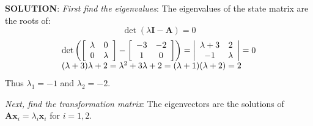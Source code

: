\textbf{SOLUTION}: \emph{First find the eigenvalues}:
The eigenvalues of the state matrix are the roots of:
\[
\det(\lambda\mathbf{I}-\mathbf{A})=0
\]
\[
\begin{array}{l}
 \det \left( {\left[ {\begin{array}{*{20}c}
   \lambda  & 0  \\
   0 & \lambda   \\
\end{array}} \right] - \left[ {\begin{array}{*{20}c}
   { - 3} & { - 2}  \\
   1 & 0  \\
\end{array}} \right]} \right) = \left| {\begin{array}{*{20}c}
   {\lambda  + 3} & 2  \\
   { - 1} & \lambda   \\
\end{array}} \right| = 0 \\ 
 (\lambda  + 3)\lambda  + 2 = \lambda ^2  + 3\lambda  + 2 = (\lambda  + 1)(\lambda  + 2) = 2 \\ 
 \end{array}
\]
Thus $\lambda_1=-1$ and $\lambda_2=-2$.

\emph{Next, find the transformation matrix}: The eigenvectors are the solutions of $\mathbf{A}\mathbf{x}_i=\lambda_i\mathbf{x}_i$ for $i=1,2$. 

